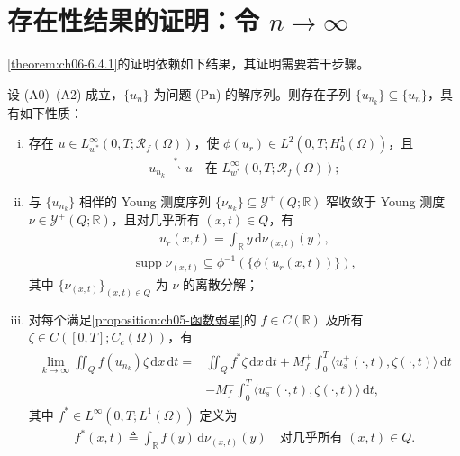 \documentclass[../../main.tex]{subfiles}%
\begin{document}
\section{存在性结果的证明：令 $n\to\infty$}\label{section:ch06-令n趋于无穷}

\cref{theorem:ch06-6.4.1}的证明依赖如下结果，其证明需要若干步骤。

\begin{theorem}\label{theorem:ch06-6.6.1}
设 (A0)--(A2) 成立，$\{u_n\}$ 为问题 (Pn) 的解序列。则存在子列 $\{u_{n_k}\}\subseteq\{u_n\}$，具有如下性质：
\begin{enumerate}[(i)]
\item 存在 $u\in L^\infty_{w^*}(0,T;\mathscr{R}_f(\Omega))$，使 $\phi(u_r)\in L^2(0,T;H^1_0(\Omega))$，且
\begin{align}
u_{n_k}\stackrel{*}{\rightharpoonup}u \quad\text{在 }L^\infty_{w^*}(0,T;\mathscr{R}_f(\Omega)); \label{align:ch6-6.77}
\end{align}
\item 与 $\{u_{n_k}\}$ 相伴的 Young 测度序列 $\{\nu_{n_k}\}\subseteq\mathcal{Y}^+(Q;\mathbb{R})$ 窄收敛于 Young 测度 $\nu\in\mathcal{Y}^+(Q;\mathbb{R})$，且对几乎所有 $(x,t)\in Q$，有
\begin{align}
u_r(x,t)=\int_\mathbb{R}y\,\mathrm{d}\nu_{(x,t)}(y), \label{align:ch6-6.78}
\end{align}
\begin{align}
\operatorname{supp}\nu_{(x,t)}\subseteq\phi^{-1}(\{\phi(u_r(x,t))\}), \label{align:ch6-6.79}
\end{align}
其中 $\{\nu_{(x,t)}\}_{(x,t)\in Q}$ 为 $\nu$ 的离散分解；
\item 对每个满足\cref{proposition:ch05-函数弱星}的 $f\in C(\mathbb{R})$ 及所有 $\zeta\in C([0,T];C_c(\Omega))$，有
\begin{align}
\begin{aligned}
\lim_{k\to\infty}\iint_Q f(u_{n_k})\zeta\,\mathrm{d}x\,\mathrm{d}t
={}&\iint_Q f^*\zeta\,\mathrm{d}x\,\mathrm{d}t
+M^+_f\int_0^T\langle u^+_s(\cdot,t),\zeta(\cdot,t)\rangle\,\mathrm{d}t\\
&-M^-_f\int_0^T\langle u^-_s(\cdot,t),\zeta(\cdot,t)\rangle\,\mathrm{d}t,
\end{aligned} \label{align:ch6-6.80}
\end{align}
其中 $f^*\in L^\infty(0,T;L^1(\Omega))$ 定义为
\begin{align}
f^*(x,t)\triangleq \int_\mathbb{R}f(y)\,\mathrm{d}\nu_{(x,t)}(y)
\quad\text{对几乎所有 }(x,t)\in Q. \label{align:ch6-6.81}
\end{align}
\end{enumerate}
\end{theorem}
\end{document}
